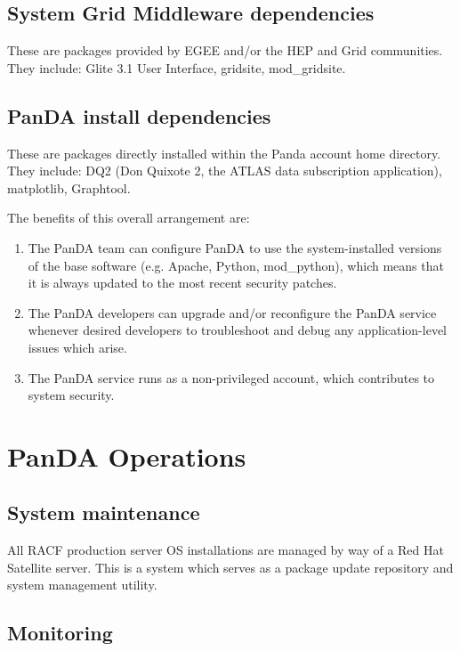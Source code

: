 \documentclass[letterpaper]{jpconf}
\begin{document}
\subsection{System Grid Middleware dependencies}
These are packages provided by EGEE and/or the HEP and Grid communities. They
include: Glite 3.1 User Interface, gridsite, mod\_gridsite.

\subsection{PanDA install dependencies} 
These are packages directly installed within the Panda account
home directory. They include: DQ2 (Don Quixote 2, the ATLAS
data subscription application), matplotlib, Graphtool. 

\bigskip

The benefits of this overall arrangement are: 
\begin{enumerate}

\item The PanDA team can configure PanDA to use the system-installed versions of
the base software (e.g. Apache, Python, mod\_python), which means that it is
always updated to the most recent security patches. 

\item The PanDA developers can upgrade and/or reconfigure the PanDA service whenever desired 
developers to troubleshoot and debug any application-level issues which arise.  

\item The PanDA service runs as a non-privileged account, which contributes to system security. 

\end{enumerate}


\section{PanDA Operations} 

\subsection{System maintenance}
All RACF production server OS installations are managed by way of a Red Hat
Satellite server. This is a system which serves as a package update repository 
and system management utility. 

\subsection{Monitoring}
\end{document}
